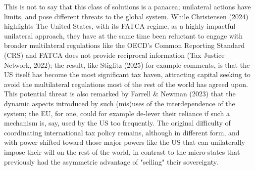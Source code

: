 This is not to say that this class of solutions is a panacea; unilateral actions have limits, and pose different threats to the global system. While Christensen (2024) highlights The United States, with its FATCA regime, as a highly impactful unilateral approach, they have at the same time been reluctant to engage with broader multilateral regulations like the OECD's Common Reporting Standard (CRS) and FATCA does not provide reciprocal information (Tax Justice Network, 2022); the result, like Stiglitz (2025) for example comments, is that the US itself has become the most significant tax haven, attracting capital seeking to avoid the multilateral regulations most of the rest of the world has agreed upon. This potential threat is also remarked by Farrell \& Newman (2023) that the dynamic aspects introduced by such (mis)uses of the interdependence of the system; the EU, for one, could for example de-lever their reliance if such a mechanism is, say, used by the US too frequently. The original difficulty of coordinating international tax policy remains, although in different form, and with power shifted toward those major powers like the US that can unilaterally impose their will on the rest of the world, in contrast to the micro-states that previously had the asymmetric advantage of "selling" their sovereignty.



